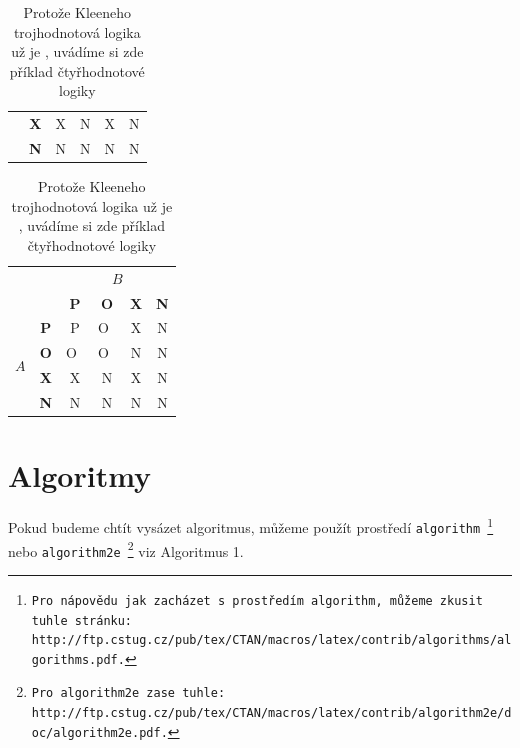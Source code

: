 \documentclass[11pt, a4paper]{article}
\begin{document}
\begin{table}[ht]
\begin{tabular}{| c | c | c | c | c | c |}
                                                              & \textbf{X}                & X          & N          & X          & N \\ \cline{2-6}
                                                              & \textbf{N}                & N          & N          & N          & N \\ \hline
    \end{tabular}
    \begin{tabular}{| c | c | c | c | c | c |} \hline
        \multicolumn{2}{|c|}{ \multirow{2}{*}{${A \rightarrow  B}$} } & \multicolumn{4}{|c|}{$B$}                                            \\ \cline{3-6}
        \multicolumn{2}{|c|}{}                                        & \textbf{P}                & \textbf{O} & \textbf{X} & \textbf{N}     \\ \hline
        \multirow{4}{*}[0pt]{$A$}                                     & \textbf{P}                & P          & O~& X          & N \\ \cline{2-6}
                                                                      & \textbf{O}                & O~& O~& N          & N \\ \cline{2-6}
                                                                      & \textbf{X}                & X          & N          & X          & N \\ \cline{2-6}
                                                                      & \textbf{N}                & N          & N          & N          & N \\ \hline
    \end{tabular}
    \caption{Protože Kleeneho trojhodnotová logika už je , uvádíme si zde příklad čtyřhodnotové logiky}
    \shorthandon{-}
\end{table}
\newpage

\section{Algoritmy}

Pokud budeme chtít vysázet algoritmus, můžeme použít prostředí \texttt{algorithm
    \footnote[2]{\raggedright Pro nápovědu jak zacházet s~prostředím \texttt{algorithm}, můžeme zkusit tuhle stránku: http://ftp.cstug.cz/pub/tex/CTAN/macros/latex/contrib/algorithms/algorithms.pdf.}}
nebo \texttt{algorithm2e
    \footnote[3]{Pro \texttt{algorithm2e} zase tuhle: http://ftp.cstug.cz/pub/tex/CTAN/macros/latex/contrib/algorithm2e/doc/algorithm2e.pdf.}}
viz Algoritmus 1.
\end{document}
